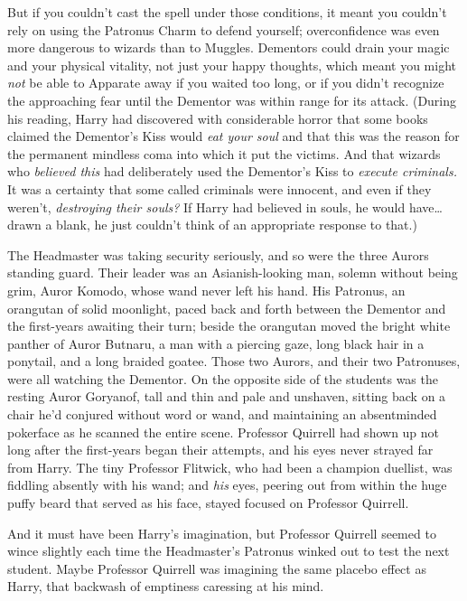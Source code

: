 But if you couldn't cast the spell under those conditions, it meant you
couldn't rely on using the Patronus Charm to defend yourself; overconfidence
was even more dangerous to wizards than to Muggles. Dementors could drain your
magic and your physical vitality, not just your happy thoughts, which meant you
might \emph{not} be able to Apparate away if you waited too long, or if you
didn't recognize the approaching fear until the Dementor was within range for
its attack. (During his reading, Harry had discovered with considerable horror
that some books claimed the Dementor's Kiss would \emph{eat your soul} and that
this was the reason for the permanent mindless coma into which it put the
victims. And that wizards who \emph{believed this} had deliberately used the
Dementor's Kiss to \emph{execute criminals.} It was a certainty that some
called criminals were innocent, and even if they weren't, \emph{destroying
their souls?} If Harry had believed in souls, he would have…drawn a
blank, he just couldn't think of an appropriate response to that.)

The Headmaster was taking security seriously, and so were the three Aurors
standing guard. Their leader was an Asianish-looking man, solemn without being
grim, Auror Komodo, whose wand never left his hand. His Patronus, an orangutan
of solid moonlight, paced back and forth between the Dementor and the
first-years awaiting their turn; beside the orangutan moved the bright white
panther of Auror Butnaru, a man with a piercing gaze, long black hair in a
ponytail, and a long braided goatee. Those two Aurors, and their two
Patronuses, were all watching the Dementor. On the opposite side of the
students was the resting Auror Goryanof, tall and thin and pale and unshaven,
sitting back on a chair he'd conjured without word or wand, and maintaining an
absentminded pokerface as he scanned the entire scene. Professor Quirrell had
shown up not long after the first-years began their attempts, and his eyes
never strayed far from Harry. The tiny Professor Flitwick, who had been a
champion duellist, was fiddling absently with his wand; and \emph{his} eyes,
peering out from within the huge puffy beard that served as his face, stayed
focused on Professor Quirrell.

And it must have been Harry's imagination, but Professor Quirrell seemed to
wince slightly each time the Headmaster's Patronus winked out to test the next
student. Maybe Professor Quirrell was imagining the same placebo effect as
Harry, that backwash of emptiness caressing at his mind.

